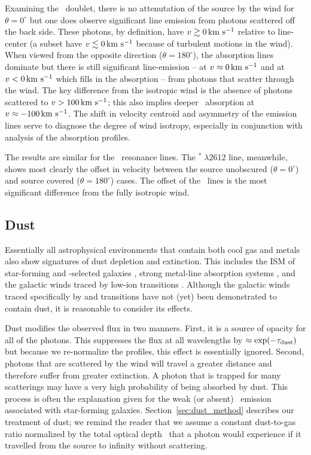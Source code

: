 \documentclass[12pt,preprint]{aastex}
\begin{document}
Examining the \mgiid\ doublet, 
there is no attenutation of the source by the wind for $\theta =
0^\circ$
but one does observe significant line emission from photons scattered
off the back side.  These photons, by definition, have $v \gtrsim 0 \, {\rm km~s^{-1}}$
relative to line-center (a subset have $v \lesssim 0 \, {\rm km~s^{-1}}$ because
of turbulent motions in the wind). 
When viewed from the opposite direction ($\theta = 180^\circ$), the
absorption lines dominate but there is still significant
line-emission -- at $v \approx 0 \, {\rm km~s^{-1}}$ and at $v < 0 \, {\rm km~s^{-1}}$ which fills
in the absorption -- from photons that scatter through the wind.  The
key difference from the isotropic wind is the absence of photons
scattered to $v > 100 \, {\rm km~s^{-1}}$;  this also implies deeper 
\mgiib\ absorption at $v \approx -100 \, {\rm km~s^{-1}}$. The 
shift in velocity centroid and asymmetry of the emission lines
serve to diagnose the degree of wind isotropy, especially in
conjunction with analysis of the absorption profiles. 

The results are similar for the \feiid\ resonance lines.  The
$^* \; \lambda 2612$ line, meanwhile, shows most clearly the
offset in velocity between the source unobscured ($\theta = 0^\circ$)
and source covered ($\theta = 180^\circ$) cases.  The offset of the
\feiis\ lines is the most significant 
difference from the fully isotropic wind.

\subsection{Dust}
\label{sec:dust}

Essentially all astrophysical environments that contain both cool gas
and metals also show signatures of dust depletion and extinction.  This includes the
ISM of star-forming and -selected galaxies
\citep[e.g.][]{ss96,pw01,pcd+07}, strong  metal-line
absorption systems \citep{ykv+06,mnt+08}, and the galactic winds traced
by low-ion transitions \citep{prs+02,rvs05b}.  Although the galactic winds
traced specifically by  and  transitions have not (yet) been
demonstrated to contain dust, it is reasonable to consider its
effects.

Dust modifies the observed flux in two manners. 
First, it is a source of opacity for all of 
the photons.  This suppresses the flux at all
wavelengths by $\approx \exp(-\tau_{\rm dust})$ but because we re-normalize the
profiles, this effect is essentially ignored.  Second, photons that are
scattered by the wind will travel a greater
distance and therefore suffer from greater extinction.  A photon that is
trapped for many scatterings may have a very high probability of being absorbed
by dust.  This process is
often the explanation given for the weak (or absent) \lya\ emission
associated with star-forming galaxies. 
Section~\ref{sec:dust_method} describes our treatment of dust; we 
remind the reader that we assume a constant dust-to-gas ratio 
normalized by the total optical
depth \taud\ that a photon would experience if it travelled from the
source to infinity without scattering. 
\end{document}
